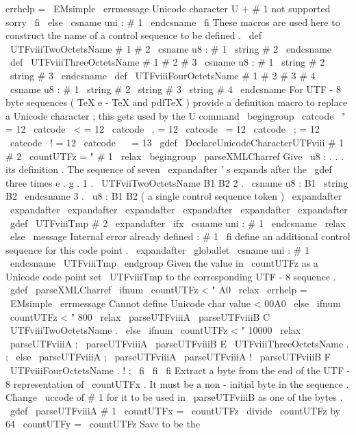 {{{{{errhelp
=
\
EMsimple
\
errmessage
{
Unicode
character
U
+
#
1
not
supported
sorry
}
%
\
fi
\
else
\
csname
uni
:
#
1
\
endcsname
\
fi
}
%
These
macros
are
used
here
to
construct
the
name
of
a
control
%
sequence
to
be
defined
.
\
def
\
UTFviiiTwoOctetsName
#
1
#
2
{
%
\
csname
u8
:
#
1
\
string
#
2
\
endcsname
}
%
\
def
\
UTFviiiThreeOctetsName
#
1
#
2
#
3
{
%
\
csname
u8
:
#
1
\
string
#
2
\
string
#
3
\
endcsname
}
%
\
def
\
UTFviiiFourOctetsName
#
1
#
2
#
3
#
4
{
%
\
csname
u8
:
#
1
\
string
#
2
\
string
#
3
\
string
#
4
\
endcsname
}
%
%
For
UTF
-
8
byte
sequences
(
TeX
e
-
TeX
and
pdfTeX
)
%
provide
a
definition
macro
to
replace
a
Unicode
character
;
%
this
gets
used
by
the
U
command
%
\
begingroup
\
catcode
\
"
=
12
\
catcode
\
<
=
12
\
catcode
\
.
=
12
\
catcode
\
=
12
\
catcode
\
;
=
12
\
catcode
\
!
=
12
\
catcode
\
~
=
13
\
gdef
\
DeclareUnicodeCharacterUTFviii
#
1
#
2
{
%
\
countUTFz
=
"
#
1
\
relax
\
begingroup
\
parseXMLCharref
%
Give
\
u8
:
.
.
.
its
definition
.
The
sequence
of
seven
\
expandafter
'
s
%
expands
after
the
\
gdef
three
times
e
.
g
.
%
%
1
.
\
UTFviiTwoOctetsName
B1
B2
%
2
.
\
csname
u8
:
B1
\
string
B2
\
endcsname
%
3
.
\
u8
:
B1
B2
(
a
single
control
sequence
token
)
%
\
expandafter
\
expandafter
\
expandafter
\
expandafter
\
expandafter
\
expandafter
\
expandafter
\
gdef
\
UTFviiiTmp
{
#
2
}
%
%
\
expandafter
\
ifx
\
csname
uni
:
#
1
\
endcsname
\
relax
\
else
\
message
{
Internal
error
already
defined
:
#
1
}
%
\
fi
%
%
define
an
additional
control
sequence
for
this
code
point
.
\
expandafter
\
globallet
\
csname
uni
:
#
1
\
endcsname
\
UTFviiiTmp
\
endgroup
}
%
%
Given
the
value
in
\
countUTFz
as
a
Unicode
code
point
set
\
UTFviiiTmp
%
to
the
corresponding
UTF
-
8
sequence
.
\
gdef
\
parseXMLCharref
{
%
\
ifnum
\
countUTFz
<
"
A0
\
relax
\
errhelp
=
\
EMsimple
\
errmessage
{
Cannot
define
Unicode
char
value
<
00A0
}
%
\
else
\
ifnum
\
countUTFz
<
"
800
\
relax
\
parseUTFviiiA
%
\
parseUTFviiiB
C
\
UTFviiiTwoOctetsName
.
%
\
else
\
ifnum
\
countUTFz
<
"
10000
\
relax
\
parseUTFviiiA
;
%
\
parseUTFviiiA
%
\
parseUTFviiiB
E
\
UTFviiiThreeOctetsName
.
{
;
}
%
\
else
\
parseUTFviiiA
;
%
\
parseUTFviiiA
%
\
parseUTFviiiA
!
%
\
parseUTFviiiB
F
\
UTFviiiFourOctetsName
.
{
!
;
}
%
\
fi
\
fi
\
fi
}
%
Extract
a
byte
from
the
end
of
the
UTF
-
8
representation
of
\
countUTFx
.
%
It
must
be
a
non
-
initial
byte
in
the
sequence
.
%
Change
\
uccode
of
#
1
for
it
to
be
used
in
\
parseUTFviiiB
as
one
%
of
the
bytes
.
\
gdef
\
parseUTFviiiA
#
1
{
%
\
countUTFx
=
\
countUTFz
\
divide
\
countUTFz
by
64
\
countUTFy
=
\
countUTFz
%
Save
to
be
the
}}}}}
